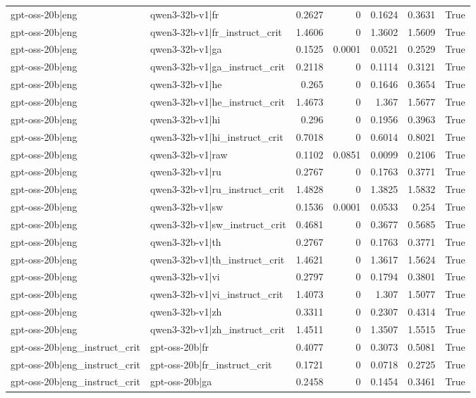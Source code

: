 \begin{table}
\begin{tabular}{l l r r r r l}
gpt-oss-20b|eng & qwen3-32b-v1|fr & 0.2627 & 0 & 0.1624 & 0.3631 & True \\
gpt-oss-20b|eng & qwen3-32b-v1|fr_instruct_crit & 1.4606 & 0 & 1.3602 & 1.5609 & True \\
gpt-oss-20b|eng & qwen3-32b-v1|ga & 0.1525 & 0.0001 & 0.0521 & 0.2529 & True \\
gpt-oss-20b|eng & qwen3-32b-v1|ga_instruct_crit & 0.2118 & 0 & 0.1114 & 0.3121 & True \\
gpt-oss-20b|eng & qwen3-32b-v1|he & 0.265 & 0 & 0.1646 & 0.3654 & True \\
gpt-oss-20b|eng & qwen3-32b-v1|he_instruct_crit & 1.4673 & 0 & 1.367 & 1.5677 & True \\
gpt-oss-20b|eng & qwen3-32b-v1|hi & 0.296 & 0 & 0.1956 & 0.3963 & True \\
gpt-oss-20b|eng & qwen3-32b-v1|hi_instruct_crit & 0.7018 & 0 & 0.6014 & 0.8021 & True \\
gpt-oss-20b|eng & qwen3-32b-v1|raw & 0.1102 & 0.0851 & 0.0099 & 0.2106 & True \\
gpt-oss-20b|eng & qwen3-32b-v1|ru & 0.2767 & 0 & 0.1763 & 0.3771 & True \\
gpt-oss-20b|eng & qwen3-32b-v1|ru_instruct_crit & 1.4828 & 0 & 1.3825 & 1.5832 & True \\
gpt-oss-20b|eng & qwen3-32b-v1|sw & 0.1536 & 0.0001 & 0.0533 & 0.254 & True \\
gpt-oss-20b|eng & qwen3-32b-v1|sw_instruct_crit & 0.4681 & 0 & 0.3677 & 0.5685 & True \\
gpt-oss-20b|eng & qwen3-32b-v1|th & 0.2767 & 0 & 0.1763 & 0.3771 & True \\
gpt-oss-20b|eng & qwen3-32b-v1|th_instruct_crit & 1.4621 & 0 & 1.3617 & 1.5624 & True \\
gpt-oss-20b|eng & qwen3-32b-v1|vi & 0.2797 & 0 & 0.1794 & 0.3801 & True \\
gpt-oss-20b|eng & qwen3-32b-v1|vi_instruct_crit & 1.4073 & 0 & 1.307 & 1.5077 & True \\
gpt-oss-20b|eng & qwen3-32b-v1|zh & 0.3311 & 0 & 0.2307 & 0.4314 & True \\
gpt-oss-20b|eng & qwen3-32b-v1|zh_instruct_crit & 1.4511 & 0 & 1.3507 & 1.5515 & True \\
gpt-oss-20b|eng_instruct_crit & gpt-oss-20b|fr & 0.4077 & 0 & 0.3073 & 0.5081 & True \\
gpt-oss-20b|eng_instruct_crit & gpt-oss-20b|fr_instruct_crit & 0.1721 & 0 & 0.0718 & 0.2725 & True \\
gpt-oss-20b|eng_instruct_crit & gpt-oss-20b|ga & 0.2458 & 0 & 0.1454 & 0.3461 & True \\

\end{tabular}
\end{table}
